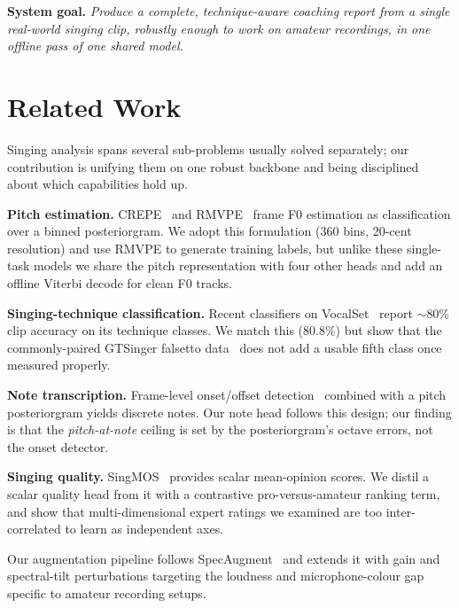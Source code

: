 \documentclass{article}
\begin{document}
\textbf{System goal.} \emph{Produce a complete, technique-aware coaching report from a
single real-world singing clip, robustly enough to work on amateur recordings, in one
offline pass of one shared model.}

\section{Related Work}\label{sec:related}

Singing analysis spans several sub-problems usually solved separately; our contribution
is unifying them on one robust backbone and being disciplined about which capabilities
hold up.

\textbf{Pitch estimation.} CREPE~\cite{Kim2018_CREPE_ICASSP} and
RMVPE~\cite{Wei2023_RMVPE_INTERSPEECH} frame F0 estimation as classification over a
binned posteriorgram. We adopt this formulation (360 bins, 20-cent resolution) and use
RMVPE to generate training labels, but unlike these single-task models we share the
pitch representation with four other heads and add an offline Viterbi decode for clean
F0 tracks.

\textbf{Singing-technique classification.} Recent classifiers on
VocalSet~\citep{Wilkins2018_VocalSet_ISMIR} report $\sim$80\% clip accuracy on its
technique classes. We match this (80.8\%) but show that the commonly-paired GTSinger
falsetto data~\citep{Zhang2024_GTSinger_NEURIPS} does not add a usable fifth class once
measured properly.

\textbf{Note transcription.} Frame-level onset/offset
detection~\citep{Hawthorne2018_OnsetsFrames_ISMIR} combined with a pitch posteriorgram
yields discrete notes. Our note head follows this design; our finding is that the
\emph{pitch-at-note} ceiling is set by the posteriorgram's octave errors, not the onset
detector.

\textbf{Singing quality.} SingMOS~\citep{SingMOS2024} provides scalar mean-opinion
scores. We distil a scalar quality head from it with a contrastive pro-versus-amateur
ranking term, and show that multi-dimensional expert ratings we examined are too
inter-correlated to learn as independent axes.

Our augmentation pipeline follows SpecAugment~\citep{Park2019_SpecAugment_INTERSPEECH}
and extends it with gain and spectral-tilt perturbations targeting the loudness and
microphone-colour gap specific to amateur recording setups.
\end{document}
